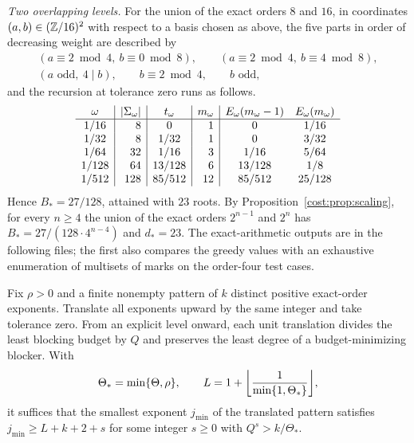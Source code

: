 \begin{example}
\emph{Two overlapping levels.} For the union of the exact orders $8$ and $16$, in
coordinates $(a,b)\in(\mathbb{Z}/16)^2$ with respect to a basis chosen as above, the five parts in
order of decreasing weight are described by
\begin{gather*}
 (a\equiv2\bmod4,\ b\equiv0\bmod8),\qquad
 (a\equiv2\bmod4,\ b\equiv4\bmod8),\\
 (a\text{ odd},\ 4\mid b),\qquad b\equiv2\bmod4,\qquad b\text{ odd},
\end{gather*}
and the recursion at tolerance zero runs as follows.
\[
\begin{array}{c|r|c|r|cc}
\omega& \lvert\Sigma_\omega\rvert& t_\omega&m_\omega&E_\omega(m_\omega-1)&E_\omega(m_\omega)\\\hline
1/16 &8&0&1&0&1/16\\
1/32 &8&1/32&1&0&3/32\\
1/64 &32&1/16&3&1/16&5/64\\
1/128 &64&13/128&6&13/128&1/8\\
1/512 &128&85/512&12&85/512&25/128
\end{array}
\]
Hence $B_*=27/128$, attained with $23$ roots. By Proposition~\ref{cost:prop:scaling}, for every
$n\ge4$ the union of the exact orders $2^{n-1}$ and $2^n$ has $B_*=27/(128\cdot4^{n-4})$
and $d_*=23$. The exact-arithmetic outputs are in the following files; the first also
compares the greedy values with an exhaustive enumeration of multisets of marks on the
order-four test cases.
\end{example}

\begin{proposition}\label{cost:prop:eventual}
Fix $\rho>0$ and a finite nonempty pattern of $k$ distinct positive exact-order exponents.
Translate all exponents upward by the same integer and take tolerance zero. From an explicit
level onward, each unit translation divides the least blocking budget by $Q$ and preserves
the least degree of a budget-minimizing blocker. With
\[
 \Theta_*=\min\set{\Theta,\rho},\qquad
 L=1+\floor*{\frac1{\min\set{1,\Theta_*}}},
\]
it suffices that the smallest exponent $j_{\min}$ of the translated pattern satisfies
$j_{\min}\ge L+k+2+s$ for some integer $s\ge0$ with $Q^s>k/\Theta_*$.
\end{proposition}

